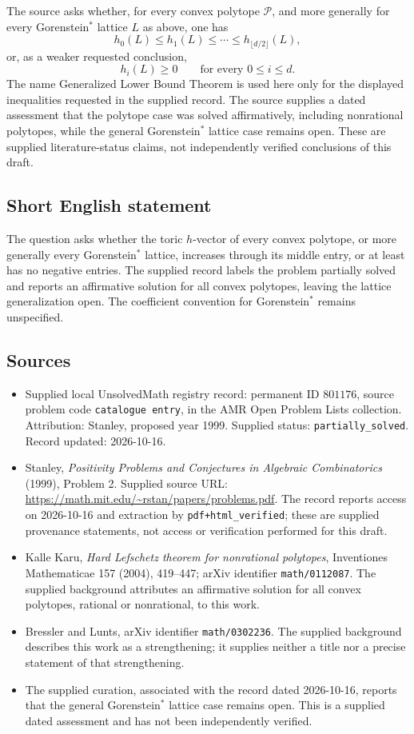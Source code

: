 \documentclass[11pt]{article}
\begin{document}
The source asks whether, for every convex polytope \(\mathcal P\), and more generally for every Gorenstein\(^*\) lattice \(L\) as above, one has
\[
h_0(L)\leq h_1(L)\leq\cdots\leq h_{\lfloor d/2\rfloor}(L),
\]
or, as a weaker requested conclusion,
\[
h_i(L)\geq 0\qquad\text{for every }0\leq i\leq d.
\]
The name Generalized Lower Bound Theorem is used here only for the displayed inequalities requested in the supplied record. The source supplies a dated assessment that the polytope case was solved affirmatively, including nonrational polytopes, while the general Gorenstein\(^*\) lattice case remains open. These are supplied literature-status claims, not independently verified conclusions of this draft.
\subsection{Short English statement}
The question asks whether the toric \(h\)-vector of every convex polytope, or more generally every Gorenstein\(^*\) lattice, increases through its middle entry, or at least has no negative entries. The supplied record labels the problem partially solved and reports an affirmative solution for all convex polytopes, leaving the lattice generalization open. The coefficient convention for Gorenstein\(^*\) remains unspecified.
\subsection{Sources}
\begin{itemize}
\item Supplied local UnsolvedMath registry record: permanent ID \(801176\), source problem code \texttt{catalogue entry}, in the AMR Open Problem Lists collection. Attribution: Stanley, proposed year 1999. Supplied status: \texttt{partially\_solved}. Record updated: 2026-10-16.
\item Stanley, \emph{Positivity Problems and Conjectures in Algebraic Combinatorics} (1999), Problem 2. Supplied source URL: \url{https://math.mit.edu/~rstan/papers/problems.pdf}. The record reports access on 2026-10-16 and extraction by \texttt{pdf+html\_verified}; these are supplied provenance statements, not access or verification performed for this draft.
\item Kalle Karu, \emph{Hard Lefschetz theorem for nonrational polytopes}, Inventiones Mathematicae 157 (2004), 419--447; arXiv identifier \texttt{math/0112087}. The supplied background attributes an affirmative solution for all convex polytopes, rational or nonrational, to this work.
\item Bressler and Lunts, arXiv identifier \texttt{math/0302236}. The supplied background describes this work as a strengthening; it supplies neither a title nor a precise statement of that strengthening.
\item The supplied curation, associated with the record dated 2026-10-16, reports that the general Gorenstein\(^*\) lattice case remains open. This is a supplied dated assessment and has not been independently verified.
\end{itemize}
\end{document}

